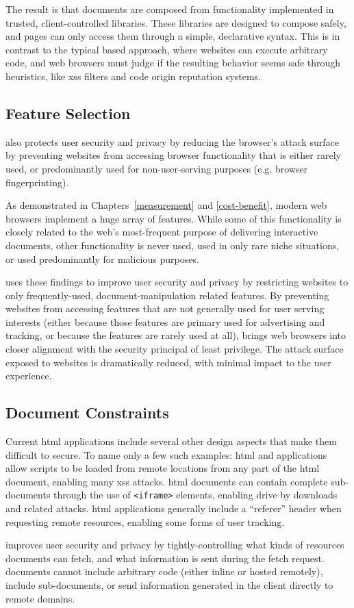The result is that \CDF documents are composed from functionality implemented
in trusted, client-controlled libraries.  These libraries are designed to
compose safely, and pages can only access them through a simple, declarative
syntax.  This is in contrast to the typical \JS based approach, where websites
can execute arbitrary code, and web browsers must judge if the resulting
behavior seems safe through heuristics, like \gls{xss} filters and code origin
reputation systems.


\subsection{Feature Selection}
\label{future-web:design:feature-selection}
\CDF also protects user security and privacy by reducing the browser's attack
surface by preventing websites from accessing browser functionality that
is either rarely used, or predominantly used for non-user-serving purposes
(e.g. browser fingerprinting).

As demonstrated in Chapters~\ref{measurement} and \ref{cost-benefit}, modern
web browsers implement a huge array of \WAPI features.  While some of this
functionality is closely related to the web's most-frequent purpose of delivering
interactive documents, other functionality is never used, used in only rare
niche situations, or used predominantly for malicious purposes.

\CDF uses these findings to improve user security and privacy by restricting
websites to only frequently-used, document-manipulation related \WAPI features.
By preventing websites from accessing features that are not generally
used for user serving interests (either because those features are
primary used for advertising and tracking, or because the features are rarely
used at all), \CDF brings web browsers into closer alignment with the security
principal of least privilege.  The attack surface exposed to websites is
dramatically reduced, with minimal impact to the user experience.


\subsection{Document Constraints}
\label{sec:design:doc-constraints}
Current \gls{html} applications include several other design aspects that make
them difficult to secure.  To name only a few such examples: \gls{html} and
\JS applications allow scripts to be loaded from remote locations from any
part of the \gls{html} document, enabling many \gls{xss} attacks.  \gls{html}
documents can contain complete sub-documents through the use of
\texttt{<iframe>} elements, enabling drive by downloads and related attacks.
\gls{html} applications generally include a ``referer'' header when
requesting remote resources, enabling some forms of user tracking.

\CDF improves user security and privacy by tightly-controlling what kinds of
resources documents can fetch, and what information is sent during the fetch
request.  \CDF documents cannot include arbitrary code (either
inline or hosted remotely), include sub-documents, or send information
generated in the client directly to remote domains.
